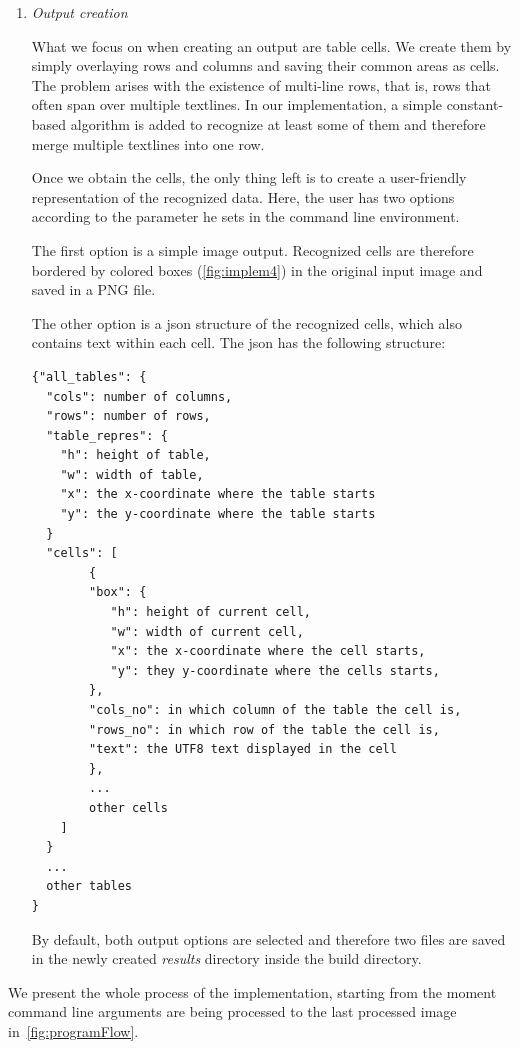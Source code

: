 \begin{enumerate}
\item \emph{Output creation}

What we focus on when creating an output are table cells. We create them by simply overlaying rows and columns and saving their common areas as cells. The problem arises with the existence of multi-line rows, that is, rows that often span over multiple textlines. In our implementation, a simple constant-based algorithm is added to recognize at least some of them and therefore merge multiple textlines into one row.

Once we obtain the cells, the only thing left is to create a user-friendly representation of the recognized data. Here, the user has two options according to the parameter he sets in the command line environment. 

The first option is a simple image output. Recognized cells are therefore bordered by colored boxes (\cref{fig:implem4}) in the original input image and saved in a PNG file.

The other option is a json structure of the recognized cells, which also contains text within each cell. The json has the following structure:

\begin{lstlisting}
{"all_tables": {
  "cols": number of columns,
  "rows": number of rows,
  "table_repres": {
    "h": height of table,
    "w": width of table,
    "x": the x-coordinate where the table starts
    "y": the y-coordinate where the table starts
  }
  "cells": [
        {
        "box": {
           "h": height of current cell,
           "w": width of current cell,
           "x": the x-coordinate where the cell starts,
           "y": they y-coordinate where the cells starts,
        },
        "cols_no": in which column of the table the cell is,
        "rows_no": in which row of the table the cell is,
        "text": the UTF8 text displayed in the cell
        },
        ...
        other cells
    ]
  }
  ...
  other tables
}
\end{lstlisting}

By default, both output options are selected and therefore two files are saved in the newly created \emph{results} directory inside the build directory.

\end{enumerate}

We present the whole process of the implementation, starting from the moment command line arguments are being processed to the last processed image in~\cref{fig:programFlow}.

